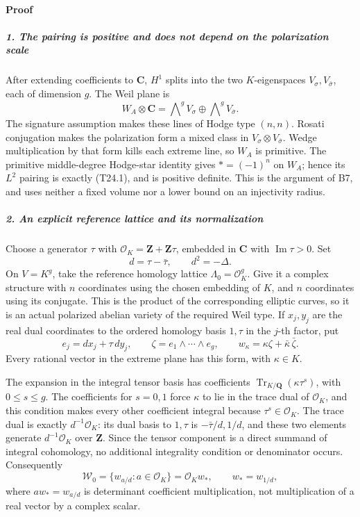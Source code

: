 \paragraph{Proof}\label{proof-5}

\subparagraph{1. The pairing is positive and does not depend on the polarization scale}\label{the-pairing-is-positive-and-does-not-depend-on-the-polarization-scale}

After extending coefficients to \(\mathbf C\), \(H^1\) splits into the two \(K\)-eigenspaces \(V_\sigma,V_{\bar\sigma}\), each of dimension \(g\). The Weil plane is \[
 W_A\otimes\mathbf C
     =\bigwedge\nolimits^g V_\sigma
        \oplus \bigwedge\nolimits^g V_{\bar\sigma}.
 \tag{T24.8}
\] The signature assumption makes these lines of Hodge type \((n,n)\). Rosati conjugation makes the polarization form a mixed class in \(V_\sigma\otimes V_{\bar\sigma}\). Wedge multiplication by that form kills each extreme line, so \(W_A\) is primitive. The primitive middle-degree Hodge-star identity gives \(*=(-1)^n\) on \(W_A\); hence its \(L^2\) pairing is exactly (T24.1), and is positive definite. This is the argument of B7, and uses neither a fixed volume nor a lower bound on an injectivity radius.

\subparagraph{2. An explicit reference lattice and its normalization}\label{an-explicit-reference-lattice-and-its-normalization}

Choose a generator \(\tau\) with \(\mathcal O_K=\mathbf Z+\mathbf Z\tau\), embedded in \(\mathbf C\) with \(\operatorname{Im}\tau>0\). Set \[
 d=\tau-\bar\tau,\qquad d^2=-\Delta.
 \tag{T24.9}
\] On \(V=K^g\), take the reference homology lattice \(\Lambda_0=\mathcal O_K^g\). Give it a complex structure with \(n\) coordinates using the chosen embedding of \(K\), and \(n\) coordinates using its conjugate. This is the product of the corresponding elliptic curves, so it is an actual polarized abelian variety of the required Weil type. If \(x_j,y_j\) are the real dual coordinates to the ordered homology basis \(1,\tau\) in the \(j\)-th factor, put \[
 e_j=dx_j+\tau\,dy_j,\qquad
 \zeta=e_1\wedge\cdots\wedge e_g,\qquad
 w_\kappa=\kappa\zeta+\bar\kappa\,\bar\zeta.
 \tag{T24.10}
\] Every rational vector in the extreme plane has this form, with \(\kappa\in K\).

The expansion in the integral tensor basis has coefficients \(\operatorname{Tr}_{K/\mathbf Q}(\kappa\tau^s)\), with \(0\le s\le g\). The coefficients for \(s=0,1\) force \(\kappa\) to lie in the trace dual of \(\mathcal O_K\), and this condition makes every other coefficient integral because \(\tau^s\in\mathcal O_K\). The trace dual is exactly \(d^{-1}\mathcal O_K\): its dual basis to \(1,\tau\) is \(-\bar\tau/d,1/d\), and these two elements generate \(d^{-1}\mathcal O_K\) over \(\mathbf Z\). Since the tensor component is a direct summand of integral cohomology, no additional integrality condition or denominator occurs. Consequently \[
 \mathscr W_0=\{w_{a/d}:a\in\mathcal O_K\}
              =\mathcal O_K w_*,\qquad w_*=w_{1/d},
 \tag{T24.11}
\] where \(a w_*=w_{a/d}\) is determinant coefficient multiplication, not multiplication of a real vector by a complex scalar.

